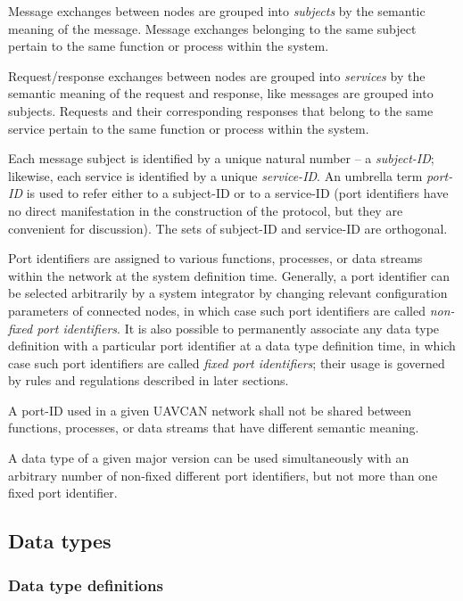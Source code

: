 Message exchanges between nodes are grouped into \emph{subjects} by the semantic meaning of the message.
Message exchanges belonging to the same subject pertain to the same function or process within the system.

Request/response exchanges between nodes are grouped into \emph{services} by the semantic meaning
of the request and response, like messages are grouped into subjects.
Requests and their corresponding responses that belong to the same service pertain to
the same function or process within the system.

Each message subject is identified by a unique natural number -- a \emph{subject-ID};
likewise, each service is identified by a unique \emph{service-ID}.
An umbrella term \emph{port-ID} is used to refer either to a subject-ID or to a service-ID
(port identifiers have no direct manifestation in the construction of the protocol,
but they are convenient for discussion).
The sets of subject-ID and service-ID are orthogonal.

Port identifiers are assigned to various functions, processes, or data streams within the network
at the system definition time.
Generally, a port identifier can be selected arbitrarily by a system integrator
by changing relevant configuration parameters of connected nodes,
in which case such port identifiers are called \emph{non-fixed port identifiers}.
It is also possible to permanently associate any data type definition with a particular port identifier
at a data type definition time,
in which case such port identifiers are called \emph{fixed port identifiers};
their usage is governed by rules and regulations described in later sections.

A port-ID used in a given UAVCAN network shall not be shared between functions, processes, or data streams
that have different semantic meaning.

A data type of a given major version can be used simultaneously with
an arbitrary number of non-fixed different port identifiers,
but not more than one fixed port identifier.

\subsection{Data types}

\subsubsection{Data type definitions}

